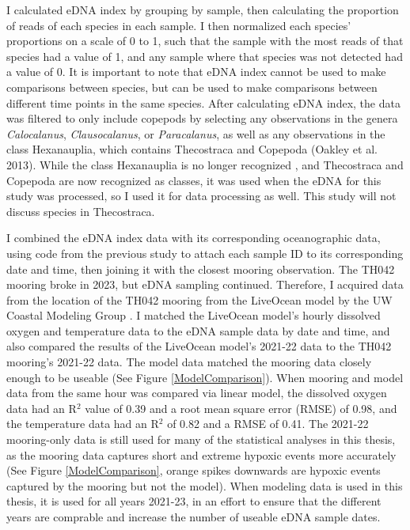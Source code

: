 \documentclass[12pt,twoside]{reedthesis}
\begin{document}
{	I calculated eDNA index by grouping by sample, then calculating the proportion of reads of each species in each sample. I then normalized each species' proportions on a scale of 0 to 1, such that the sample with the most reads of that species had a value of 1, and any sample where that species was not detected had a value of 0. It is important to note that eDNA index cannot be used to make comparisons between species, but can be used to make comparisons between different time points in the same species. After calculating eDNA index, the data was filtered to only include copepods by selecting any observations in the genera \textit{Calocalanus}, \textit{Clausocalanus}, or \textit{Paracalanus}, as well as any observations in the class Hexanauplia, which contains Thecostraca and Copepoda (Oakley et al. 2013). While the class Hexanauplia is no longer recognized \autocite{WoRMSWorldRegister, Lozano-Fernandez2019}, and Thecostraca and Copepoda are now recognized as classes, it was used when the eDNA for this study was processed, so I used it for data processing as well. This study will not discuss species in Thecostraca.
	
	I combined the eDNA index data with its corresponding oceanographic data, using code from the previous study to attach each sample ID to its corresponding date and time, then joining it with the closest mooring observation. The TH042 mooring broke in 2023, but eDNA sampling continued. Therefore, I acquired data from the location of the TH042 mooring from the LiveOcean model by the UW Coastal Modeling Group \autocite{Siedlecki2015a, Fatland2016, LiveOceanHomepage}. I matched the LiveOcean model's hourly dissolved oxygen and temperature data to the eDNA sample data by date and time, and also compared the results of the LiveOcean model's 2021-22 data to the TH042 mooring's 2021-22 data. The model data matched the mooring data closely enough to be useable (See Figure \ref{ModelComparison}). When mooring and model data from the same hour was compared via linear model, the dissolved oxygen data had an R$^2$ value of 0.39 and a root mean square error (RMSE) of 0.98, and the temperature data had an R$^2$ of 0.82 and a RMSE of 0.41. The 2021-22 mooring-only data is still used for many of the statistical analyses in this thesis, as the mooring data captures short and extreme hypoxic events more accurately (See Figure \ref{ModelComparison}, orange spikes downwards are hypoxic events captured by the mooring but not the model). When modeling data is used in this thesis, it is used for all years 2021-23, in an effort to ensure that the different years are comprable and increase the number of useable eDNA sample dates. 
	
}
\end{document}
